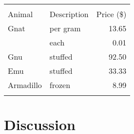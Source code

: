 \begin{tabular}{ | l | l | r | }
  \hline\noalign{\smallskip}
  \multicolumn{2}{c}{Item} \\
  \cline{1-2}\noalign{\smallskip}
  Animal & Description & Price (\$) \\
  \noalign{\smallskip}\hline\noalign{\smallskip}
  Gnat  & per gram & 13.65 \\
        & each     &  0.01 \\
  Gnu   & stuffed  & 92.50 \\
  Emu   & stuffed  & 33.33 \\
  Armadillo & frozen & 8.99 \\
  \noalign{\smallskip}\hline
\end{tabular}


\section{Discussion}


